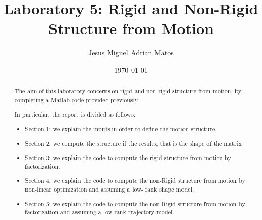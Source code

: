 \documentclass[]{article}
\title{Laboratory 5: Rigid and Non-Rigid Structure from Motion}
\author{Jesus Miguel Adrian Matos}
\date{\today}
\begin{document}
\maketitle

\begin{abstract}
\noindent 
The aim of this laboratory concerns on rigid and non-rigid structure from motion, by completing a Matlab code provided previously. 

\noindent In particular, the report is divided as follows:
\begin{itemize}
\item Section 1: we explain the inputs in order to define the motion structure.
\item Section 2: we compute the structure if the results, that is the shape of the matrix
\item Section 3: we explain the code to compute the rigid structure from motion by factorization.
\item Section 4: we explain the code to compute the non-Rigid structure from motion by non-linear optimization and assuming a low- rank shape model.
\item Section 5: we explain the code to compute the non-Rigid structure from motion by factorization and assuming a low-rank trajectory model.
\end{itemize}
%


\end{abstract}






\newpage

\end{document}
